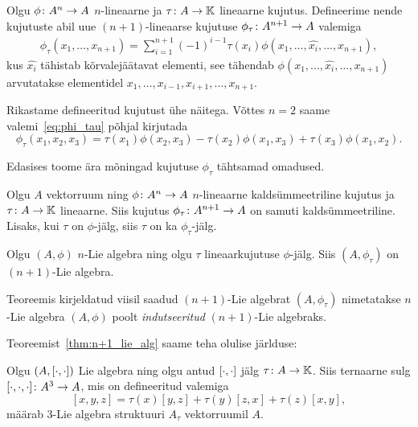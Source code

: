 Olgu $\phi \colon A^n \rightarrow A$ $n$-lineaarne ja
$\tau \colon A \rightarrow \mathbb{K}$ lineaarne kujutus. Defineerime nende
kujutuste abil uue $(n+1)$-lineaarse kujutuse
$\phi_\tau \colon A^{n+1} \rightarrow A$ valemiga
\begin{align}\label{eq:phi_tau}
    \phi_\tau \left( x_1, \dots, x_{n+1} \right) =
    \sum_{i=1}^{n+1} (-1)^{i-1} \tau(x_i)
        \phi(x_1, \dots, \hat{x_i}, \dots, x_{n+1}),
\end{align}
kus $\hat{x_i}$ tähistab kõrvalejäätavat elementi, see tähendab
$\phi(x_1, \dots, \hat{x_i}, \dots, x_{n+1})$ arvutatakse elementidel
$x_1, \dots, x_{i-1}, x_{i+1}, \dots, x_{n+1}$.

Rikastame defineeritud kujutust ühe näitega. Võttes $n = 2$ saame
valemi~\ref{eq:phi_tau} põhjal kirjutada
\[
    \phi_\tau (x_1, x_2, x_3) =
        \tau(x_1) \phi(x_2, x_3) -
        \tau(x_2) \phi(x_1, x_3) +
        \tau(x_3) \phi(x_1, x_2).
\]

Edasises toome ära mõningad kujutuse $\phi_\tau$ tähtsamad omadused.

\begin{lemma}
    Olgu $A$ vektorruum ning $\phi \colon A^n \rightarrow A$ $n$-lineaarne kaldsümmeetriline kujutus
    ja $\tau \colon A \rightarrow \mathbb{K}$ lineaarne. Siis kujutus
    $\phi_\tau \colon A^{n+1} \rightarrow A$ on samuti kaldsümmeetriline. Lisaks,
    kui $\tau$ on $\phi$-jälg, siis $\tau$ on ka $\phi_\tau$-jälg.
\end{lemma}

\begin{thm}\label{thm:n+1_lie_alg}
    Olgu $(A, \phi)$ $n$-Lie algebra ning olgu $\tau$ lineaarkujutuse
    $\phi$-jälg. Siis $(A, \phi_\tau)$ on $(n+1)$-Lie algebra.
\end{thm}

Teoreemis kirjeldatud viisil saadud $(n+1)$-Lie algebrat $(A, \phi_\tau)$
nimetatakse $n$-Lie algebra $(A, \phi)$ poolt \emph{indutseeritud}
$(n+1)$-Lie algebraks.

Teoreemist~\ref{thm:n+1_lie_alg} saame teha olulise järlduse:

\begin{jar}
    Olgu $(A, \left[ \cdot, \cdot \right])$ Lie algebra ning olgu antud
    $\left[ \cdot, \cdot \right]$ jälg $\tau \colon A \rightarrow \mathbb{K}$. Siis ternaarne sulg
    $[ \cdot, \cdot, \cdot ] \colon A^3 \rightarrow A$, mis on defineeritud
    valemiga
    \[
        [x, y, z] = \tau(x)[y, z] + \tau(y)[z, x] + \tau(z)[x, y],
    \]
    määrab $3$-Lie algebra struktuuri $A_\tau$ vektorruumil $A$.
\end{jar}
